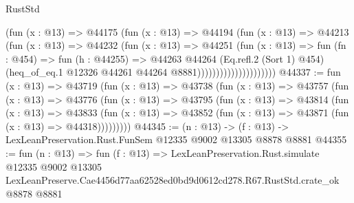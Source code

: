 \begin{lexlean}{RustStd}
\begin{coremodule}
                                (fun (x : @13) =>
                                @44175
                                  (fun (x : @13) =>
                                  @44194
                                    (fun (x : @13) =>
                                    @44213
                                      (fun (x : @13) =>
                                      @44232
                                        (fun (x : @13) =>
                                        @44251
                                          (fun (x : @13) =>
                                          fun (fn : @454) =>
                                          fun (h : @44255) =>
                                          @44263
                                            @44264
                                            (Eq.refl.{2} (Sort 1) @454)
                                            (heq_of_eq.{1}
                                              @12326
                                              @44261
                                              @44264
                                              @8881)))))))))))))))))))))
@44337 := fun (x : @13) =>
  @43719
    (fun (x : @13) =>
    @43738
      (fun (x : @13) =>
      @43757
        (fun (x : @13) =>
        @43776
          (fun (x : @13) =>
          @43795
            (fun (x : @13) =>
            @43814
              (fun (x : @13) =>
              @43833
                (fun (x : @13) => @43852 (fun (x : @13) => @43871 (fun (x : @13) => @44318)))))))))
@44345 := (n : @13) -> (f : @13) -> LexLeanPreservation.Rust.FunSem @12335 @9002 @13305 @8878 @8881
@44355 := fun (n : @13) =>
  fun (f : @13) =>
  LexLeanPreservation.Rust.simulate
    @12335
    @9002
    @13305
    LexLeanPreserve.Cae4456d77aa62528ed0bd9d0612cd278.R67.RustStd.crate_ok
    @8878
    @8881
\end{coremodule}
\end{lexlean}
